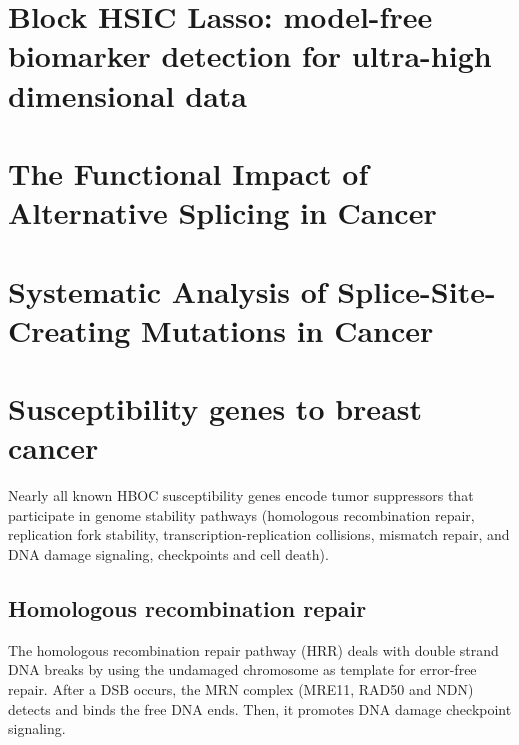 \documentclass[
  11pt,
]{env/yjiao}
\begin{document}
\hypertarget{appendix-appendix}{%
\appendix}


\hypertarget{block-hsic-lasso}{%
\chapter{Block HSIC Lasso: model-free biomarker detection for ultra-high dimensional data}\label{block-hsic-lasso}}



\hypertarget{smartas}{%
\chapter{The Functional Impact of Alternative Splicing in Cancer}\label{smartas}}



\hypertarget{scm}{%
\chapter{Systematic Analysis of Splice-Site-Creating Mutations in Cancer}\label{scm}}



\hypertarget{hboc-genes}{%
\chapter{Susceptibility genes to breast cancer}\label{hboc-genes}}

Nearly all known HBOC susceptibility genes encode tumor suppressors that participate in genome stability pathways (homologous recombination repair, replication fork stability, transcription-replication collisions, mismatch repair, and DNA damage signaling, checkpoints and cell death).

\hypertarget{homologous-recombination-repair}{%
\section{Homologous recombination repair}\label{homologous-recombination-repair}}

The homologous recombination repair pathway (HRR) deals with double strand DNA breaks by using the undamaged chromosome as template for error-free repair. After a DSB occurs, the MRN complex (MRE11, RAD50 and NDN) detects and binds the free DNA ends. Then, it promotes DNA damage checkpoint signaling.
\end{document}
